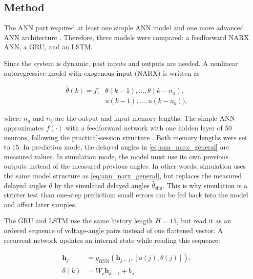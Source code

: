 \subsection{Method}

The ANN part required at least one simple ANN model and one more
advanced ANN architecture \cite{assignment5sc28}. Therefore, three
models were compared: a feedforward NARX ANN, a GRU, and an LSTM.

Since the system is dynamic, past inputs and outputs are needed. A
nonlinear autoregressive model with exogenous input (NARX) is written as

\begin{equation}
\begin{aligned}
\hat{\theta}(k)
=
f\big(&
\theta(k-1),\ldots,\theta(k-n_a),\\
&
u(k-1),\ldots,u(k-n_b)
\big),
\end{aligned}
\label{eq:ann_narx_general}
\end{equation}

where \(n_a\) and \(n_b\) are the output and input memory lengths. The
simple ANN approximates \(f(\cdot)\) with a feedforward network with one
hidden layer of 50 neurons, following the practical-session structure
\cite{course5sc28}. Both memory lengths were set to 15.
In prediction mode, the delayed angles in \eqref{eq:ann_narx_general}
are measured values. In simulation mode, the model must use its own
previous outputs instead of the measured previous angles. In other
words, simulation uses the same model structure as
\eqref{eq:ann_narx_general}, but replaces the measured delayed angles
\(\theta\) by the simulated delayed angles
\(\hat{\theta}_{\mathrm{sim}}\). This is why simulation is a stricter
test than one-step prediction: small errors can be fed back into the
model and affect later samples.

The GRU and LSTM use the same history length \(H=15\), but read it as an
ordered sequence of voltage-angle pairs instead of one flattened vector.
A recurrent network updates an internal state while reading this
sequence:

\begin{equation}
\begin{aligned}
\mathbf{h}_j
&=
g_{\mathrm{RNN}}(\mathbf{h}_{j-1}, [u(j),\theta(j)]),\\
\hat{\theta}(k)
&=
W_o\mathbf{h}_{k-1}+b_o .
\end{aligned}
\label{eq:ann_recurrent_state}
\end{equation}

